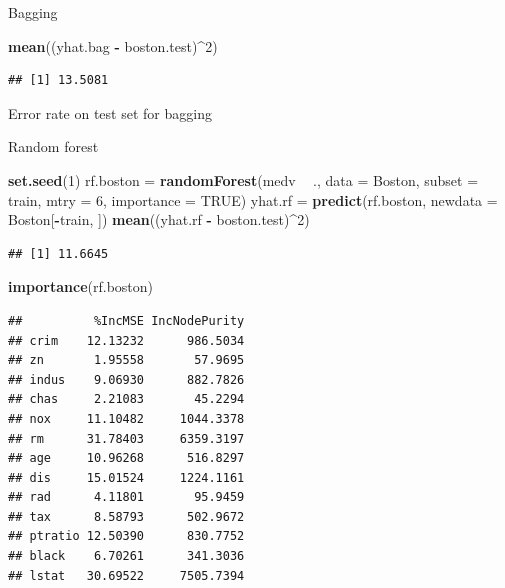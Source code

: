 \documentclass[ignorenonframetext,]{beamer}
\newenvironment{Shaded}{\begin{snugshade}}{\end{snugshade}}
\newcommand{\KeywordTok}[1]{\textcolor[rgb]{0.13,0.29,0.53}{\textbf{#1}}}
\newcommand{\DataTypeTok}[1]{\textcolor[rgb]{0.13,0.29,0.53}{#1}}
\newcommand{\DecValTok}[1]{\textcolor[rgb]{0.00,0.00,0.81}{#1}}
\newcommand{\StringTok}[1]{\textcolor[rgb]{0.31,0.60,0.02}{#1}}
\newcommand{\OtherTok}[1]{\textcolor[rgb]{0.56,0.35,0.01}{#1}}
\newcommand{\OperatorTok}[1]{\textcolor[rgb]{0.81,0.36,0.00}{\textbf{#1}}}
\newcommand{\NormalTok}[1]{#1}
\begin{document}
\begin{frame}[fragile]
\begin{block}{Bagging}
\begin{Shaded}
\begin{Highlighting}[]
\KeywordTok{mean}\NormalTok{((yhat.bag }\OperatorTok{-}\StringTok{ }\NormalTok{boston.test)}\OperatorTok{^}\DecValTok{2}\NormalTok{)}
\end{Highlighting}
\end{Shaded}

\begin{verbatim}
## [1] 13.5081
\end{verbatim}

Error rate on test set for bagging

\end{block}

\end{frame}

\begin{frame}[fragile]

\begin{block}{Random forest}

\begin{Shaded}
\begin{Highlighting}[]
\KeywordTok{set.seed}\NormalTok{(}\DecValTok{1}\NormalTok{)}
\NormalTok{rf.boston =}\StringTok{ }\KeywordTok{randomForest}\NormalTok{(medv }\OperatorTok{~}\StringTok{ }\NormalTok{., }\DataTypeTok{data =}\NormalTok{ Boston, }\DataTypeTok{subset =}\NormalTok{ train, }\DataTypeTok{mtry =} \DecValTok{6}\NormalTok{, }
    \DataTypeTok{importance =} \OtherTok{TRUE}\NormalTok{)}
\NormalTok{yhat.rf =}\StringTok{ }\KeywordTok{predict}\NormalTok{(rf.boston, }\DataTypeTok{newdata =}\NormalTok{ Boston[}\OperatorTok{-}\NormalTok{train, ])}
\KeywordTok{mean}\NormalTok{((yhat.rf }\OperatorTok{-}\StringTok{ }\NormalTok{boston.test)}\OperatorTok{^}\DecValTok{2}\NormalTok{)}
\end{Highlighting}
\end{Shaded}

\begin{verbatim}
## [1] 11.6645
\end{verbatim}

\begin{Shaded}
\begin{Highlighting}[]
\KeywordTok{importance}\NormalTok{(rf.boston)}
\end{Highlighting}
\end{Shaded}

\begin{verbatim}
##          %IncMSE IncNodePurity
## crim    12.13232      986.5034
## zn       1.95558       57.9695
## indus    9.06930      882.7826
## chas     2.21083       45.2294
## nox     11.10482     1044.3378
## rm      31.78403     6359.3197
## age     10.96268      516.8297
## dis     15.01524     1224.1161
## rad      4.11801       95.9459
## tax      8.58793      502.9672
## ptratio 12.50390      830.7752
## black    6.70261      341.3036
## lstat   30.69522     7505.7394
\end{verbatim}


\end{block}
\end{frame}
\end{document}
